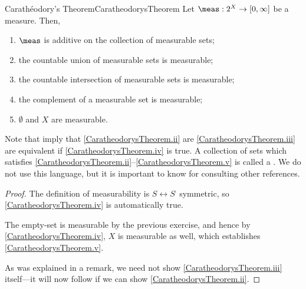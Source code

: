 \begin{thm}{Carathéodory's Theorem}{CaratheodorysTheorem}
Let $\meas :2^X\rightarrow [0,\infty ]$ be a measure.  Then,
\begin{enumerate}
\item \label{CaratheodorysTheorem.i}$\meas$ is additive on the collection of measurable sets;
\item \label{CaratheodorysTheorem.ii}the countable union of measurable sets is measurable;
\item \label{CaratheodorysTheorem.iii}the countable intersection of measurable sets is measurable;
\item \label{CaratheodorysTheorem.iv}the complement of a measurable set is measurable;
\item \label{CaratheodorysTheorem.v}$\emptyset$ and $X$ are measurable.
\end{enumerate}
\begin{rmk}
Note that  imply that \cref{CaratheodorysTheorem.ii} are \cref{CaratheodorysTheorem.iii} are equivalent if \cref{CaratheodorysTheorem.iv} is true.  A collection of sets which satisfies \cref{CaratheodorysTheorem.ii}--\cref{CaratheodorysTheorem.v} is called a .  We do not use this language, but it is important to know for consulting other references.
\end{rmk}
\begin{proof}
The definition of measurability is $S\leftrightarrow S^{\comp}$ symmetric, so \cref{CaratheodorysTheorem.iv} is automatically true.

The empty-set is measurable by the previous exercise, and hence by \cref{CaratheodorysTheorem.iv}, $X$ is measurable as well, which establishes \cref{CaratheodorysTheorem.v}.

As was explained in a remark, we need not show \cref{CaratheodorysTheorem.iii} itself---it will now follow if we can show \cref{CaratheodorysTheorem.ii}.


\end{proof}
\end{thm}
